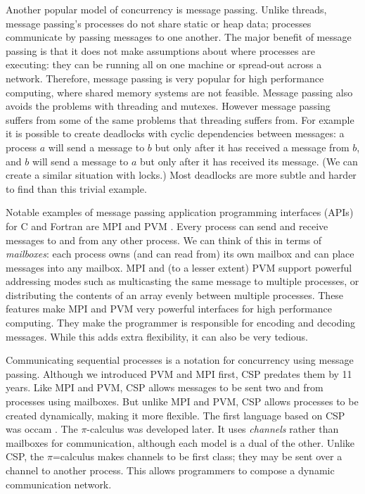 Another popular model of concurrency is message passing.
Unlike threads, message passing's processes do not share static or heap
data;
processes communicate by passing messages to one another.
The major benefit of message passing is that it does not make assumptions
about where processes are executing:
they can be running all on one machine or spread-out across a network.
Therefore, message passing is very popular for high performance computing,
where shared memory systems are not feasible.
Message passing also avoids the problems with threading and mutexes.
However message passing suffers from some of the same problems that
threading suffers from.
For example it is possible to create deadlocks with cyclic dependencies
between messages:
a process $a$ will send a message to $b$ but only after it has received a
message from $b$,
and $b$ will send a message to $a$ but only after it has received its message.
(We can create a similar situation with locks.)
Most deadlocks are more subtle and harder to find than this trivial example.

Notable examples of message passing application programming interfaces (APIs)
for C and Fortran \citep{backus:1957:fortran} are
MPI \citep{mpi} and PVM \citep{pvm}.
Every process can send and receive messages to and from any other process.
We can think of this in terms of \emph{mailboxes}:
each process owns (and can read from) its own mailbox and can place messages
into any mailbox.
MPI and (to a lesser extent) PVM
support powerful addressing modes
such as multicasting the same message to multiple processes, or
distributing the contents of an array evenly between
multiple processes.
These features make MPI and PVM very powerful interfaces for high performance
computing.
They make the programmer is responsible for encoding and decoding messages.
While this adds extra flexibility,
it can also be very tedious.

Communicating sequential processes \citep{hoare:1978:CSP} is a notation for
concurrency using message passing.
Although we introduced PVM and MPI first, CSP predates them by 11 years.
Like MPI and PVM, CSP allows messages to be sent two and from processes
using mailboxes.
But unlike MPI and PVM, CSP allows processes to be created dynamically,
making it more flexible.
The first language based on CSP was occam \citep{occam1, occam3}.
The $\pi$-calculus \citep{milner:pi} was developed later.
It uses \emph{channels} rather than mailboxes for communication,
although each model is a dual of the other.
Unlike CSP, the $\pi$=calculus makes channels to be first class;
they may be sent over a channel to another process.
This allows programmers to compose a dynamic communication network.

